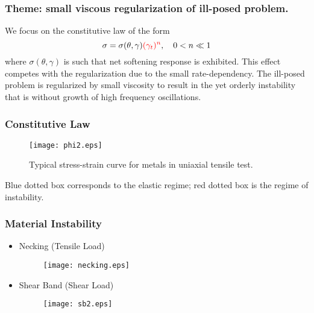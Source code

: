 \documentclass{beamer}
\def\red{\color{red}}
\def\blue{\color{blue}}
\begin{document}
\begin{frame}
 \frametitle{Theme: small viscous regularization of ill-posed problem.}
 We focus on the constitutive law of the form
$$\sigma=\sigma(\theta,\gamma){\red (\gamma_t)^n}, \quad 0<n\ll1$$
where $\sigma(\theta,\gamma)$ is such that {\blue net softening response} is exhibited. This effect competes with the regularization due to the {\blue small rate-dependency}.
 \vfill
The ill-posed problem is regularized by small viscosity to result in the yet orderly instability that is without growth of high frequency oscillations.
 \vfill
\end{frame}

\begin{frame}
 \frametitle{Constitutive Law}
 \begin{figure}
    \centering
    \center
    \texttt{[image: phi2.eps]} 
    \caption{Typical stress-strain curve for metals in uniaxial tensile test.}
 \end{figure} 
 Blue dotted box corresponds to the elastic regime; red dotted box is the regime of instability.
 \vfill
\end{frame}

\begin{frame}
 \frametitle{Material Instability}
 \begin{itemize}
  \item Necking (Tensile Load)
   \begin{figure}
    \centering
      \texttt{[image: necking.eps]} 
    \end{figure} 
  \item Shear Band (Shear Load)
     \begin{figure}
    \centering
      \texttt{[image: sb2.eps]} 
    \end{figure} 
 \end{itemize}
 \vfill
\end{frame}
\end{document}
